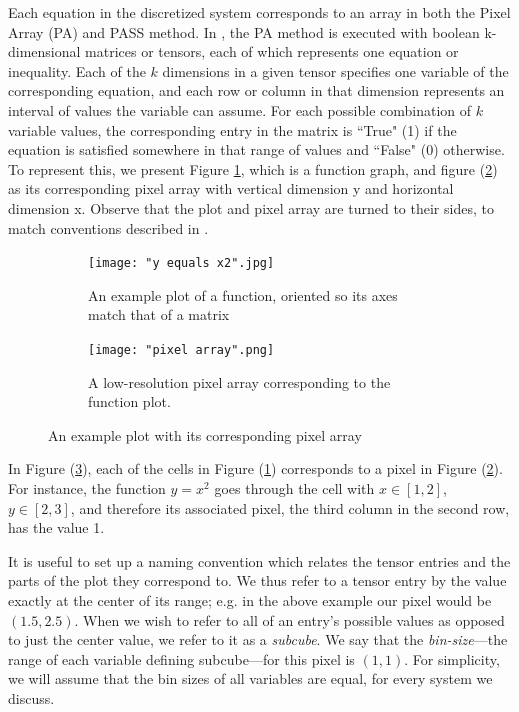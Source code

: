 \documentclass[11pt]{article}
\begin{document}
Each equation in the discretized system corresponds to an array in both the Pixel Array (PA) and PASS method. In \citep{Introduction_to_PA}, the PA method is executed with boolean k-dimensional matrices or tensors, each of which represents one equation or inequality. Each of the $k$ dimensions in a given tensor specifies one variable of the corresponding equation, and each row or column in that dimension represents an interval of values the variable can assume. For each possible combination of $k$ variable values, the corresponding entry in the matrix is ``True" (1) if the equation is satisfied somewhere in that range of values and ``False" (0) otherwise. To represent this, we present Figure \cref{sample_function}, which is a function graph, and figure (\cref{sample_pixel_array}) as its corresponding pixel array with vertical dimension y and horizontal dimension x. Observe that the plot and pixel array are turned to their sides, to match conventions described in \citep{Introduction_to_PA}.

\begin{figure}[h]
\begin{subfigure}{.4\textwidth}
  \centering
  \captionsetup{width=0.8\textwidth}
  \texttt{[image: "y equals x2".jpg]}
  \caption{An example plot of a function, oriented so its axes match that of a matrix}
  \label{sample_function}
\end{subfigure}%
\begin{subfigure}{.4\textwidth}
  \centering
  \captionsetup{width=0.84\textwidth}
  \texttt{[image: "pixel array".png]}
  \caption{A low-resolution pixel array corresponding to the function plot.}
  \label{sample_pixel_array}
\end{subfigure}%
\caption{An example plot with its corresponding pixel array}
\label{plot_and_pa}
\end{figure}

In Figure (\ref{plot_and_pa}), each of the cells in Figure (\ref{sample_function}) corresponds to a pixel in Figure (\ref{sample_pixel_array}). For instance, the function $y=x^2$ goes through the cell with $x \in [1,2]$, $y \in [2,3]$, and therefore its associated pixel, the third column in the second row, has the value 1.

It is useful to set up a naming convention which relates the tensor entries and the parts of the plot they correspond to. We thus refer to a tensor entry by the value exactly at the center of its range; e.g. in the above example our pixel would be $(1.5, 2.5)$. When we wish to refer to all of an entry's possible values as opposed to just the center value, we refer to it as a \textit{subcube}. We say that the \textit{bin-size}---the range of each variable defining subcube---for this pixel is $(1,1)$. For simplicity, we will assume that the bin sizes of all variables are equal, for every system we discuss. 
\end{document}
